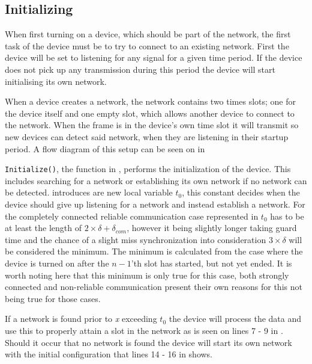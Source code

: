 \subsection{Initializing} %
\label{sub:setupCCRC} 
When first turning on a device, which should be part of the network, the first task of the device must be to try to connect to an existing network.
First the device will be set to listening for any signal for a given time period. 
If the device does not pick up any transmission during this period the device will start initialising its own network.

When a device creates a network, the network contains two times slots; one for the device itself and one empty slot, which allows another device to connect to the network.
When the frame is in the device's own time slot it will transmit so new devices can detect said network, when they are listening in their startup period.  
A flow diagram of this setup can be seen on in 

 
\bigskip \noindent
\texttt{Initialize()}, the function in , performs the initialization of the device.
This includes searching for a network or establishing its own network if no network can be detected.
 introduces are new local variable $t_0$, this constant decides when the device should give up listening for a network and instead establish a network.
For the completely connected reliable communication case represented in  $t_0$ has to be at least the length of $2 \times \delta + \delta_{com}$, however it being slightly longer taking guard time and the chance of a slight miss synchronization into consideration $3 \times \delta$ will be considered the minimum.
The minimum is calculated from the case where the device is turned on after the $n-1$'th slot has started, but not yet ended.
It is worth noting here that this minimum is only true for this case, both strongly connected and non-reliable communication present their own reasons for this not being true for those cases.

If a network is found prior to \textit{x} exceeding $t_0$ the device will process the data and use this to properly attain a slot in the network as is seen on lines 7 - 9 in .
Should it occur that no network is found the device will start its own network with the initial configuration that lines 14 - 16 in  shows.

